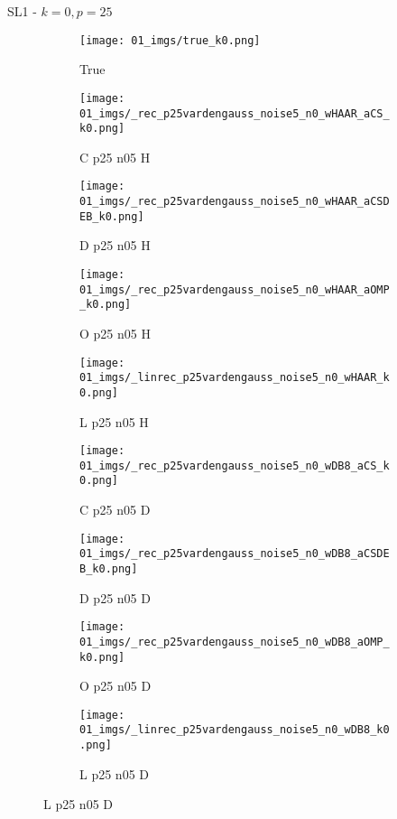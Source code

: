 \begin{frame}{SL1 - $k=0,p=25$}{}
\begin{figure}
\begin{subfigure}{0.1\textwidth}
\texttt{[image: 01\_imgs/true\_k0.png]}
\caption*{\Tiny True}
\end{subfigure}
\begin{subfigure}{0.1\textwidth}
\texttt{[image: 01\_imgs/\_rec\_p25vardengauss\_noise5\_n0\_wHAAR\_aCS\_k0.png]}
\caption*{\Tiny C p25 n05 H}
\end{subfigure}
\begin{subfigure}{0.1\textwidth}
\texttt{[image: 01\_imgs/\_rec\_p25vardengauss\_noise5\_n0\_wHAAR\_aCSDEB\_k0.png]}
\caption*{\Tiny D p25 n05 H}
\end{subfigure}
\begin{subfigure}{0.1\textwidth}
\texttt{[image: 01\_imgs/\_rec\_p25vardengauss\_noise5\_n0\_wHAAR\_aOMP\_k0.png]}
\caption*{\Tiny O p25 n05 H}
\end{subfigure}
\begin{subfigure}{0.1\textwidth}
\texttt{[image: 01\_imgs/\_linrec\_p25vardengauss\_noise5\_n0\_wHAAR\_k0.png]}
\caption*{\Tiny L p25 n05 H}
\end{subfigure}
\begin{subfigure}{0.1\textwidth}
\texttt{[image: 01\_imgs/\_rec\_p25vardengauss\_noise5\_n0\_wDB8\_aCS\_k0.png]}
\caption*{\Tiny C p25 n05 D}
\end{subfigure}
\begin{subfigure}{0.1\textwidth}
\texttt{[image: 01\_imgs/\_rec\_p25vardengauss\_noise5\_n0\_wDB8\_aCSDEB\_k0.png]}
\caption*{\Tiny D p25 n05 D}
\end{subfigure}
\begin{subfigure}{0.1\textwidth}
\texttt{[image: 01\_imgs/\_rec\_p25vardengauss\_noise5\_n0\_wDB8\_aOMP\_k0.png]}
\caption*{\Tiny O p25 n05 D}
\end{subfigure}
\begin{subfigure}{0.1\textwidth}
\texttt{[image: 01\_imgs/\_linrec\_p25vardengauss\_noise5\_n0\_wDB8\_k0.png]}
\caption*{\Tiny L p25 n05 D}
\end{subfigure}

\vspace{5pt}


\end{figure}
\end{frame}
